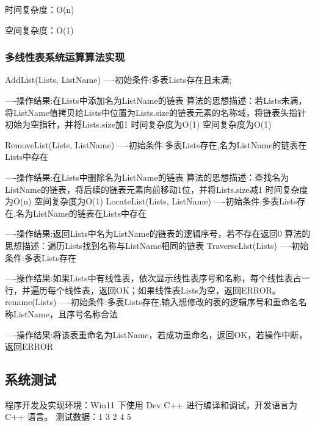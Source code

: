 \documentclass[supercite]{Experimental_Report}
\theoremstyle{definition}
\begin{document}
时间复杂度：O(n)

空间复杂度：O(1)

\subsubsection{多线性表系统运算算法实现}
AddList(Lists, ListName)
----初始条件:多表Lists存在且未满;

----操作结果:在Lists中添加名为ListName的链表
算法的思想描述：若Lists未满，将ListName值拷贝给Lists中位置为Lists.size的链表元素的名称域，将链表头指针初始为空指针，并将Lists.size加1
时间复杂度为O(1)
空间复杂度为O(1)

RemoveList(Lists, ListName)
----初始条件:多表Lists存在,名为ListName的链表在Lists中存在

----操作结果:在Lists中删除名为ListName的链表
算法的思想描述：查找名为ListName的链表，将后续的链表元素向前移动1位，并将Lists.size减1
时间复杂度为O(n)
空间复杂度为O(1)
LocateList(Lists, ListName)
----初始条件:多表Lists存在,名为ListName的链表在Lists中存在

----操作结果:返回Lists中名为ListName的链表的逻辑序号，若不存在返回0
算法的思想描述：遍历Lists找到名称与ListName相同的链表
TraverseList(Lists)
----初始条件:多表Lists存在

----操作结果:如果Lists中有线性表，依次显示线性表序号和名称，每个线性表占一行，并遍历每个线性表，返回OK；如果线性表Lists为空，返回ERROR。
rename(Lists)
----初始条件:多表Lists存在,输入想修改的表的逻辑序号和重命名名称ListName，且序号名称合法

----操作结果:将该表重命名为ListName，若成功重命名，返回OK，若操作中断，返回ERROR 
\subsection{系统测试}
程序开发及实现环境：Win11 下使用 Dev C++ 进行编译和调试，开发语言为 C++ 语言。
测试数据：1 3 2 4 5
\end{document}
